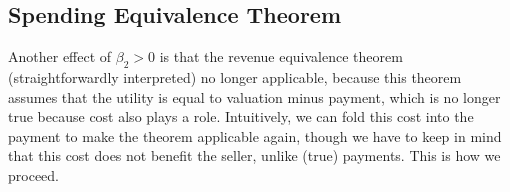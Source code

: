 \subsection{Spending Equivalence Theorem}

Another effect of $\beta_2>0$ is that the revenue equivalence theorem
(straightforwardly interpreted) no longer applicable, because this theorem 
assumes
that the utility is equal to valuation minus payment, which is no longer
true because cost also plays a role.  Intuitively, we can fold this cost
into the payment to make the theorem applicable again, though we have to
keep in mind that this cost does not benefit the seller, unlike (true)
payments.  This is how we proceed.





